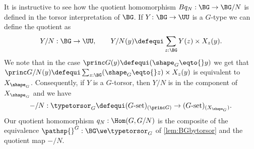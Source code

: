 \begin{remark}
It is instructive to see how the quotient homomorphism $Bq_N:\BG\to \BG/N$ is defined in the torsor interpretation of $\BG$.  If $Y\colon \BG\to\UU$ is a $G$-type we can define the quotient as
$$
Y/N:\BG\to\UU,\qquad Y/N(y)\defequi\sum_{z:\BG}Y(z)\times X_z(y).
$$
We note that in the case $\princ G(y)\defequi (\shape_G\eqto{}y)$ we get
that
$
\princ G /N(y)\defequi\sum_{z:\BG}(\shape_G\eqto{}z)\times X_z(y)
$
is equivalent to $X_{\shape_G}$.  Consequently, if $Y$ is a $G$-torsor, then $Y/N$ is in the component of $X_{\shape_G}$ and we have
$$-/N:\typetorsor_G\defequi (G\text{-set})_{(\princ G)}\to (G\text{-set})_{(X_{\shape_G})}.
$$ Our quotient homomorphism $q_N:\Hom(G,G/N)$ is the composite of the equivalence $\pathsp{}^G:\BG\we\typetorsor_G$ of \cref{lem:BGbytorsor} and the quotient map $-/N$.
\end{remark}

